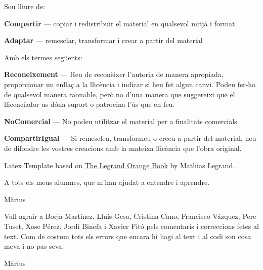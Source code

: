 \noindent Sou lliure de:
\begin{description}[leftmargin=\parindent]
 \item {\bf Compartir} — copiar i redistribuir el material en qualsevol mitjà i format
 \item {\bf Adaptar} — remesclar, transformar i crear a partir del material
\end{description}

\noindent Amb els termes següents:
\begin{description}[leftmargin=\parindent]
 \item {\bf Reconeixement} — Heu de reconèixer l'autoria de manera apropiada, proporcionar un enllaç a la llicència i indicar si heu fet algun canvi. Podeu fer-ho de qualsevol manera raonable, però no d'una manera que suggereixi que el llicenciador us dóna suport o patrocina l'ús que en feu.
 \item {\bf NoComercial} — No podeu utilitzar el material per a finalitats comercials.
 \item {\bf CompartirIgual} — Si remescleu, transformeu o creeu a partir del material, heu de difondre les vostres creacions amb la mateixa llicència que l'obra original.
\end{description}

\noindent Latex Template based on \href{https://www.latextemplates.com/template/the-legrand-orange-book}{The Legrand Orange Book} by Mathias Legrand.


\begin{dedication}
 A tots els meus alumnes, que m'han ajudat a entendre i aprendre.
 \par   %
    \vspace{\baselineskip}
    Màrius

    \vspace{4\baselineskip}
    \vspace{4\baselineskip}
    Vull agrair a Borja Martínez, Lluís Gesa, Cristina Cano, Francisco Vázquez, Pere Tuset, Xose Pérez, Jordi Binefa i Xavier Fitó pels comentaris i correccions fetes al text. Com de costum tots els errors que encara hi hagi al text i al codi son cosa meva i no pas seva.
    
    \vspace{\baselineskip}
    Màrius
\end{dedication}



